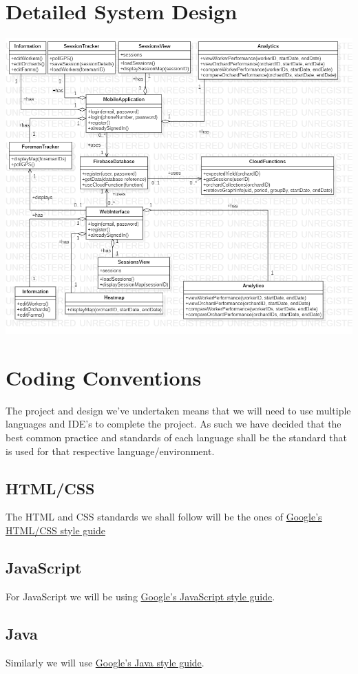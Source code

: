 \documentclass[12pt]{article}
\begin{document}
  \section{Detailed System Design}
  \includegraphics[width=1.2\linewidth]{UMLClassDiag.png}
  \newpage
  
  \section{Coding Conventions}
  \flushleft
  The project and design we've undertaken means that we will need to use multiple languages and IDE's to complete the project. As such we have decided that the best common practice and standards of each language shall be the standard that is used for that respective language/environment.
  \subsection{HTML/CSS}
  The HTML and CSS standards we shall follow will be the ones of \href{https://google.github.io/styleguide/htmlcssguide.html}{Google's HTML/CSS style guide}
  
  \subsection{JavaScript}
  For JavaScript we will be using \href{https://google.github.io/styleguide/jsguide.html}{Google's JavaScript style guide}.
  
  \subsection{Java}
  Similarly we will use \href{https://google.github.io/styleguide/javaguide.html}{Google's Java style guide}.
\end{document}
